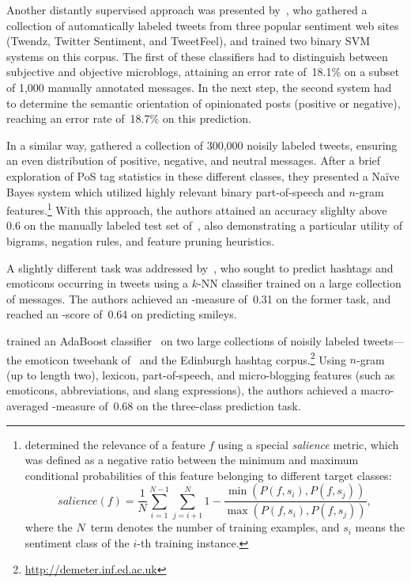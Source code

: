 Another distantly supervised approach was presented
by~\citet{Barbosa:10}, who gathered a collection of automatically
labeled tweets from three popular sentiment web sites (Twendz, Twitter
Sentiment, and TweetFeel), and trained two binary SVM systems on this
corpus.  The first of these classifiers had to distinguish between
subjective and objective microblogs, attaining an error rate of~18.1\%
on a subset of 1,000 manually annotated messages.  In the next step,
the second system had to determine the semantic orientation of
opinionated posts (positive or negative), reaching an error rate
of~18.7\% on this prediction.

In a similar way, \citet{Pak:10} gathered a collection of 300,000
noisily labeled tweets, ensuring an even distribution of positive,
negative, and neutral messages.  After a brief exploration of PoS tag
statistics in these different classes, they presented a Na{\"i}ve
Bayes system which utilized highly relevant binary part-of-speech and
$n$-gram features.\footnote{\citet{Pak:10} determined the relevance of
  a feature $f$ using a special \emph{salience} metric, which was
  defined as a negative ratio between the minimum and maximum
  conditional probabilities of this feature belonging to different
  target classes:
  \begin{equation*}
    salience(f) = \frac{1}{N}\sum_{i=1}^{N-1}\sum_{j=i+1}^N 1 - \frac{\min(P(f, s_i), P(f, s_j))}{\max(P(f, s_i), P(f, s_j))},
  \end{equation*}
  where the $N$~term denotes the number of training examples, and
  $s_i$ means the sentiment class of the $i$-th training instance.}
With this approach, the authors attained an accuracy slighlty above
0.6 on the manually labeled test set of~\citet{Go:09}, also
demonstrating a particular utility of bigrams, negation rules, and
feature pruning heuristics.

A slightly different task was addressed by~\citet{Davidov:10}, who
sought to predict hashtags and emoticons occurring in tweets using a
$k$-NN classifier trained on a large collection of messages.  The
authors achieved an \F-measure of~0.31 on the former task, and reached
an \F-score of~0.64 on predicting smileys.

\citet{Kouloumpis:11} trained an AdaBoost
classifier~\cite{Schapire:00} on two large collections of noisily
labeled tweets---the emoticon tweebank of~\citet{Go:09} and the
Edinburgh hashtag corpus.\footnote{\url{http://demeter.inf.ed.ac.uk}}
Using $n$-gram (up to length two), lexicon, part-of-speech, and
micro-blogging features (such as emoticons, abbreviations, and slang
expressions), the authors achieved a macro-averaged \F-measure of~0.68
on the three-class prediction task.

